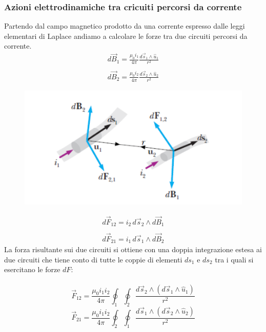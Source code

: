 \documentclass[x11names]{report}
\begin{document}
\subsubsection{Azioni elettrodinamiche tra cricuiti percorsi da corrente}
Partendo dal campo magnetico prodotto da una corrente espresso dalle leggi elementari di Laplace andiamo a calcolare le forze tra due circuiti percorsi da corrente.
\begin{gather*}
	d\vec{B}_1 = \frac{\mu_0 i_1}{4\pi}\frac{d\vec{s}_1\wedge\hat{u}_1}{r^2} \\ \\
	d\vec{B}_2 = \frac{\mu_0 i_2}{4\pi}\frac{d\vec{s}_2\wedge\hat{u}_2}{r^2}
\end{gather*}
\begin{figure}
	\includegraphics[scale=0.5]{img/az_el.png}
\end{figure}
\begin{gather*}
	d\vec{F}_{12} = i_2 \, d\vec{s}_2 \wedge d\vec{B}_1 \\ \\
	d\vec{F}_{21} = i_1 \, d\vec{s}_1 \wedge d\vec{B}_2
\end{gather*}  
La forza risultante sui due circuiti si ottiene con una doppia integrazione estesa ai due circuiti che tiene conto di tutte le coppie di elementi \(ds_1\) e \(ds_2\) tra i quali si esercitano le forze \(dF\): \\ \\
\[
\vec{F}_{12} = \frac{\mu_0i_1i_2}{4\pi}\oint_1\oint_2\frac{d\vec{s}_2 \wedge (d\vec{s}_1\wedge\hat{u}_1)}{r^2}
\]
\[
\vec{F}_{21} = \frac{\mu_0i_1i_2}{4\pi}\oint_2\oint_1\frac{d\vec{s}_1 \wedge (d\vec{s}_2\wedge\hat{u}_2)}{r^2}
\]
\end{document}

